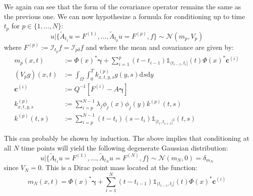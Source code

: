 \documentclass{article}
\theoremstyle{definition}
\theoremstyle{remark}
\theoremstyle{remark}
\begin{document}
\noindent We again can see that the form of the covariance operator remains the same as the previous one. We can now hypothesize a formula for conditioning up to time $t_p$ for $p\in\{1,\dots,N\}$:
\begin{equation}
    u|\{\tilde{A}_{t_1}u=F^{(1)},\dots,\tilde{A}_{t_p}u=F^{(p)},f\}\sim\mathcal{N}(m_p,V_p)
\end{equation}
where $F^{(p)}:=\mathcal{I}_{t_p}f=\mathcal{I}_{p\delta}f$ and where the mean and covariance are given by:
\begin{align}
    m_{p}(x,t) &:= \Phi(x)^{*}\boldsymbol{\gamma} + \sum_{i=1}^{p}(t-t_{i-1})\mathbb{1}_{(t_{i-1},t_i]}(t)\Phi(x)^{*}\boldsymbol{c}^{(i)} \\
    (V_{p}g)(x,t) &:= \int_{\Omega}\int_{0}^{T}k_{x,t,y,s}^{(p)}g(y,s)\mathrm{d}s\mathrm{d}y \\
    \boldsymbol{c}^{(i)} &:= Q^{-1}\left[F^{(i)}-A\boldsymbol{\gamma}\right] \\
    k_{x,t,y,s}^{(p)} &:= \sum_{i=p}^{N-1}\lambda_{j}\phi_{j}(x)\phi_{j}(y)k^{(p)}(t,s) \\
    k^{(p)}(t,s) &:= \sum_{i=p}^{N-1}(t-t_i)(s-t_i)\mathbb{1}_{(t_i,t_{i+1}]^2}(t,s)
\end{align}

This can probably be shown by induction. The above implies that conditioning at all $N$ time points will yield the following degenerate Gaussian distribution:
\begin{equation}
    u|\{\tilde{A}_{t_1}u=F^{(1)},\dots,\tilde{A}_{t_N}u=F^{(N)},f\}\sim\mathcal{N}(m_N,0)=\delta_{m_N}
\end{equation}
since $V_N=0$. This is a Dirac point mass located at the function:
\begin{equation}
    m_N(x,t)=\Phi(x)^{*}\boldsymbol{\gamma}+\sum_{i=1}^{N}(t-t_{i-1})\mathbb{1}_{(t_{i-1},t_i]}(t)\Phi(x)^{*}\boldsymbol{c}^{(i)}
\end{equation}













\clearpage
\end{document}

